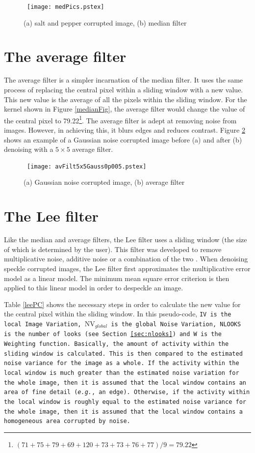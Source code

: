\documentclass[12pt]{report}
\begin{document}
\begin{figure}[htb]
	\centerline{ \hbox{
		\texttt{[image: medPics.pstex]}
	}}
		\caption{(a) salt and pepper corrupted image, (b) median filter}
		\label{medPics}
\end{figure}


\section{The average filter}
The average filter is a simpler incarnation of the median filter.
It uses the same process of replacing the central pixel within a sliding window with a new value.
This new value is the average of all the pixels within the sliding window.
For the kernel shown in Figure \ref{medianFig}, the average filter would 
change the value of the central pixel to 79.22\footnote{$(71+75+79+69+120+73+73+76+77) / 9 = 79.22$}.
The average filter is adept at removing noise from images. However, in achieving this, it 
blurs edges and reduces contrast.
Figure \ref{avPics} shows an example of a Gaussian noise corrupted image before (a) and after (b) denoising
with a $5 \times 5$ average filter.
\begin{figure}[htb]
	\centerline{ \hbox{
                \texttt{[image: avFilt5x5Gauss0p005.pstex]}
	}}
                \caption{(a) Gaussian noise corrupted image, (b) average filter}
                \label{avPics}
\end{figure}


\section{The Lee filter}
\label{sec:leeFilt}
Like the median and average filters, the Lee filter \cite{lee80} uses a sliding window
(the size of which is determined by the user).
This filter was developed to remove multiplicative noise, additive noise
or a combination of the two \cite{lee94}. When denoising speckle corrupted images,
the Lee filter first approximates the multiplicative error model as a linear model.
The minimum mean square error criterion is then applied to this linear model
in order to despeckle an image. 

Table \ref{leePC} shows the necessary steps
in order to calculate the new value for the central pixel within the sliding window.
In this pseudo-code, \tt IV \rm is the local Image Variation, 
\tt $\mbox{NV}_{global}$ \rm is the global Noise Variation,
\tt NLOOKS \rm is the number of looks (see Section \ref{sec:nlooks}) and \tt W \rm is the Weighting function.
Basically, the amount of activity within the sliding window is calculated. This
is then compared to the estimated noise variance for the image as a whole. 
If the activity within the local window is much greater than the estimated noise
variation for the whole image, then it is assumed that the local window contains
an area of fine detail (\emph{e.g.}, an edge). Otherwise, if the activity within the 
local window is roughly equal to the estimated noise variance for the whole image,
then it is assumed that the local window contains a homogeneous area corrupted
by noise.
\end{document}
